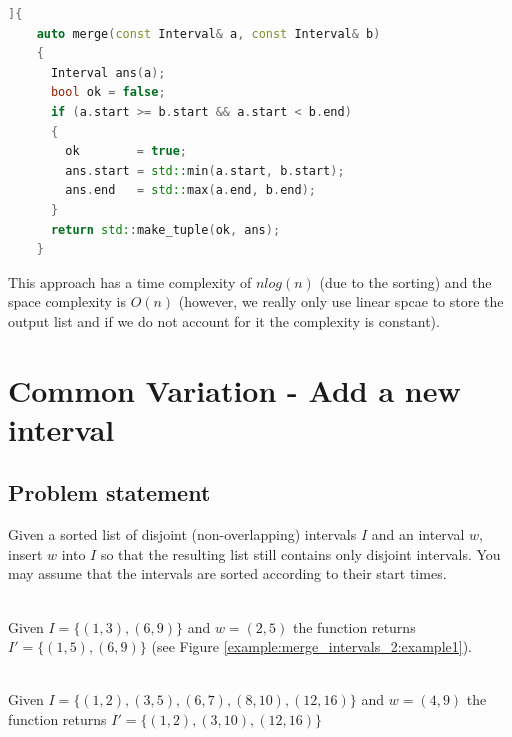 \begin{lstlisting}[language=c++, caption={Function to merge two sorted intervals.},label=list:merge_interval:newmergefunction]]{
	auto merge(const Interval& a, const Interval& b)
	{
	  Interval ans(a);
	  bool ok = false;
	  if (a.start >= b.start && a.start < b.end)
	  {
	    ok        = true;
	    ans.start = std::min(a.start, b.start);
	    ans.end   = std::max(a.end, b.end);
	  }
	  return std::make_tuple(ok, ans);
	}             
\end{lstlisting} 

This approach has a time complexity of $nlog(n)$ (due to the sorting) 
and the space complexity is $O(n)$ (however, we really only use linear spcae to store the output list and if we do not account for it the complexity is constant).

\section{Common Variation - Add a new interval}
\subsection{Problem statement}
\begin{exercise}
\label{example:merge_intervals_2:exercice1_2}
Given a sorted list of disjoint (non-overlapping) intervals $I$ and an interval $w$, insert $w$ into $I$ so that the resulting list still contains only disjoint intervals.
You may assume that the intervals are sorted according to their start times.

	\begin{example}
		\label{example:merge_intervals_2:example1}
		\hfill \\
		Given $I=\{(1,3),(6,9)\}$ and $w=(2,5)$ the function returns $I'=\{(1,5),(6,9)\}$ (see Figure \ref{example:merge_intervals_2:example1}).
	\end{example}

	\begin{example}
		\label{example:merge_intervals_2:example2}
		\hfill \\
		Given $I=\{(1,2),(3,5),(6,7),(8,10),(12,16)\}$ and $w=(4,9)$ the function returns $I'=\{(1,2),(3,10),(12,16)\}$
	\end{example}

\end{exercise}

